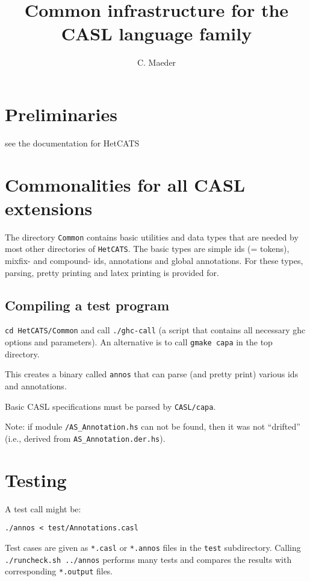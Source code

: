 \documentclass{article}
\begin{document}
\title{Common infrastructure for the CASL language family}

\author{C. Maeder}

\maketitle

\section{Preliminaries}

see the documentation for HetCATS

\section{Commonalities for all CASL extensions}

The directory \texttt{Common} contains basic utilities and data types that are
needed by most other directories of \texttt{HetCATS}. The basic types are
simple ids (= tokens), mixfix- and compound- ids, annotations and global
annotations. For these types, parsing, pretty printing and latex printing is
provided for.

\subsection{Compiling a test program}

\texttt{cd HetCATS/Common} and call \texttt{./ghc-call} (a script that contains
all necessary ghc options and parameters). An alternative is to call
\texttt{gmake capa} in the top directory.

This creates a binary called \texttt{annos} that can parse (and pretty
print) various ids and annotations. 

Basic CASL specifications must be parsed by \texttt{CASL/capa}.

Note: if module \texttt{/AS\_Annotation.hs} can not be found, then
it was not ``drifted'' (i.e., derived from \texttt{AS\_Annotation.der.hs}). 

\section{Testing}

A test call might be: 

\texttt{./annos < test/Annotations.casl}

Test cases are given as \texttt{*.casl} or \texttt{*.annos} files in the
\texttt{test} subdirectory. Calling \texttt{./runcheck.sh ../annos} performs
many tests and compares the results with corresponding \texttt{*.output}
files.
\end{document}
